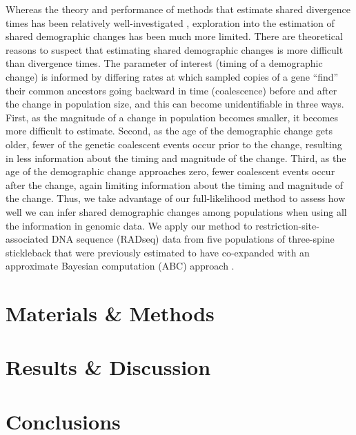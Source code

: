 Whereas the theory and performance of methods that estimate shared divergence
times has been relatively well-investigated
\citep[e.g.,][]{Oaks2012,Hickerson2013,Oaks2014reply,Oaks2014dpp,Overcast2017,Oaks2018ecoevolity},
exploration into the estimation of shared demographic changes has been much
more limited.
There are theoretical reasons to suspect that estimating shared demographic
changes is more difficult than divergence times.
The parameter of interest (timing of a demographic change) is informed by
differing rates at which sampled copies of a gene ``find'' their common
ancestors going backward in time (coalescence) before and after the change in
population size, and this can become unidentifiable in three ways.
First, as the magnitude of a change in population becomes smaller,
it becomes more difficult to estimate.
Second, as the age of the demographic change gets older, fewer of the genetic
coalescent events occur prior to the change, resulting in less information
about the timing and magnitude of the change.
Third, as the age of the demographic change approaches zero, fewer coalescent
events occur after the change, again limiting information about the timing and
magnitude of the change.
Thus, we take advantage of our full-likelihood method to assess how well we can
infer shared demographic changes among populations when using all the
information in genomic data.
We apply our method to restriction-site-associated DNA sequence (RADseq) data
from five populations of three-spine stickleback
\citep[();][]{Hohenlohe2010}
that were previously estimated to have co-expanded with an approximate Bayesian
computation (ABC) approach \citep{Xue2015}.

\ifembed{

}{}

\section{Materials \& Methods}




\section{Results \& Discussion}




\section{Conclusions}

